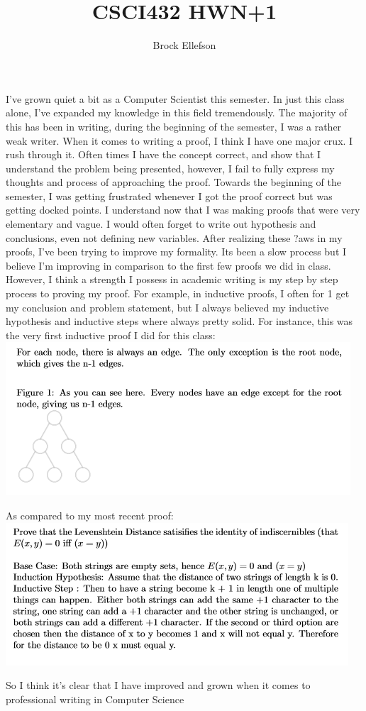 \documentclass[10pt,a4paper]{article}
\author{Brock Ellefson}
\title{CSCI432 HWN+1}
\begin{document}
\maketitle
\doublespacing

I've grown quiet a bit as a Computer Scientist this semester. In just this class alone, I've expanded my knowledge in this field tremendously. The majority of this has been in writing, during the beginning of the semester, I was a rather weak writer. When it comes to writing a proof, I think I have one major crux. I rush through it. Often times I have the concept correct, and show that I understand the problem being presented, however, I fail to fully express my thoughts and process of approaching the proof. Towards the beginning of the semester, I was getting frustrated whenever I got the proof correct but was getting docked points. I understand now that I was making proofs that were very elementary and vague. I would often forget to write out hypothesis and conclusions, even not defining new variables. After realizing these ?aws in my proofs, I've been trying to improve my formality. Its been a slow process but I believe I'm improving in comparison to the first few proofs we did in class. However, I think a strength I possess in academic writing is my step by step process to proving my proof. For example, in inductive proofs, I often for 1 get my conclusion and problem statement, but I always believed my inductive hypothesis and inductive steps where always pretty solid. For instance, this was the very first inductive proof I did for this class:
\\
\includegraphics[scale=.75]{firstproof.png}

As compared to my most recent proof:
\\
\includegraphics[scale=.75]{secondproof.png}

So I think it's clear that I have improved and grown when it comes to professional writing in Computer Science
\end{document}
